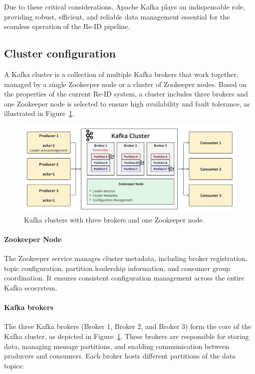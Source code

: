 Due to these critical considerations, Apache Kafka plays an indispensable role, providing robust, efficient, and reliable data management essential for the seamless operation of the Re-ID pipeline.

\subsection{Cluster configuration}

A Kafka cluster is a collection of multiple Kafka brokers that work together, managed by a single Zookeeper node or a cluster of Zookeeper nodes. Based on the properties of the current Re-ID system, a cluster includes three brokers and one Zookeeper node is selected to ensure high availability and fault tolerance, as illustrated in Figure~\ref{fig:kafka_cluster}.

\begin{figure}[htbp]
    \centering
    \includegraphics[width=1\textwidth]{Figure/kafka_overview.png}
    \caption{Kafka clusters with three brokers and one Zookeeper node.}
    \label{fig:kafka_cluster}
\end{figure}

\paragraph{Zookeeper Node}

The Zookeeper service manages cluster metadata, including broker registration, topic configuration, partition leadership information, and consumer group coordination. It ensures consistent configuration management across the entire Kafka ecosystem.

\paragraph{Kafka brokers}

The three Kafka brokers (Broker 1, Broker 2, and Broker 3) form the core of the Kafka cluster, as depicted in Figure~\ref{fig:kafka_cluster}. These brokers are responsible for storing data, managing message partitions, and enabling communication between producers and consumers. Each broker hosts different partitions of the data topics:

